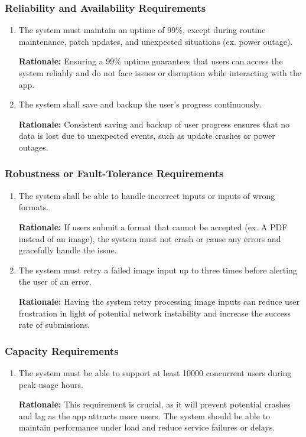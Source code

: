 \documentclass[]{article}
\begin{document}
\subsubsection{Reliability and Availability Requirements}
\label{ssub:reliability_and_availability_requirements}
\begin{enumerate}[{PR-RA}1. ]
	\item The system must maintain an uptime of 99\%, except during routine maintenance, patch updates, and unexpected situations (ex. power outage).
		
	{\bf Rationale:} Ensuring a 99\% uptime guarantees that users can access the system reliably and do not face issues or disruption while interacting with the app.
	\item The system shall save and backup the user's progress continuously.
	
	{\bf Rationale:} Consistent saving and backup of user progress ensures that no data is lost due to unexpected events, such as update crashes or power outages.
\end{enumerate}

\subsubsection{Robustness or Fault-Tolerance Requirements}
\label{ssub:robustness_or_fault_tolerance_requirements}
\begin{enumerate}[{PR-RFT}1. ]
	\item The system shall be able to handle incorrect inputs or inputs of wrong formats.
		
	{\bf Rationale:} If users submit a format that cannot be accepted (ex. A PDF instead of an image), the system must not crash or cause any errors and gracefully handle the issue.
	\item The system must retry a failed image input up to three times before alerting the user of an error.
	
	{\bf Rationale:} Having the system retry processing image inputs can reduce user frustration in light of potential network instability and increase the success rate of submissions.
\end{enumerate}

\subsubsection{Capacity Requirements}
\label{ssub:capacity_requirements}
\begin{enumerate}[{PR-C}1. ]
	\item The system must be able to support at least 10000 concurrent users during peak usage hours.
	
	{\bf Rationale:} This requirement is crucial, as it will prevent potential crashes and lag as the app attracts more users. The system should be able to maintain performance under load and reduce service failures or delays.
\end{enumerate}
\end{document}
